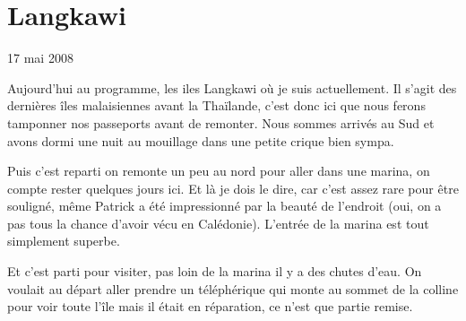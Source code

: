 \section{Langkawi}

17 mai 2008

\begin{multicols}{2}

Aujourd'hui au programme, les iles Langkawi où je suis actuellement. Il s'agit des dernières îles malaisiennes avant la Thaïlande, c'est donc ici que nous ferons tamponner nos passeports avant de remonter. Nous sommes arrivés au Sud et avons dormi une nuit au mouillage dans une petite crique bien sympa.


Puis c'est reparti on remonte un peu au nord pour aller dans une marina, on compte rester quelques jours ici. Et là je dois le dire, car c'est assez rare pour être souligné, même Patrick a été impressionné par la beauté de l'endroit (oui, on a pas tous la chance d'avoir vécu en Calédonie). L'entrée de la marina est tout simplement superbe.




Et c'est parti pour visiter, pas loin de la marina il y a des chutes d'eau. On voulait au départ aller prendre un téléphérique qui monte au sommet de la colline pour voir toute l'île mais il était en réparation, ce n'est que partie remise.



\end{multicols}
